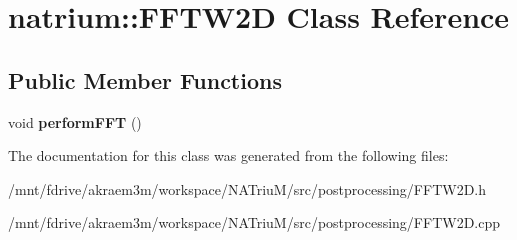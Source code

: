 \hypertarget{classnatrium_1_1FFTW2D}{
\section{natrium::FFTW2D Class Reference}
\label{classnatrium_1_1FFTW2D}
}
\subsection*{Public Member Functions}
\begin{DoxyCompactItemize}
\item 
\hypertarget{classnatrium_1_1FFTW2D_a50f754398d2335061cf8057ccb55d899}{
void {\bfseries performFFT} ()}
\label{classnatrium_1_1FFTW2D_a50f754398d2335061cf8057ccb55d899}

\end{DoxyCompactItemize}


The documentation for this class was generated from the following files:\begin{DoxyCompactItemize}
\item 
/mnt/fdrive/akraem3m/workspace/NATriuM/src/postprocessing/FFTW2D.h\item 
/mnt/fdrive/akraem3m/workspace/NATriuM/src/postprocessing/FFTW2D.cpp\end{DoxyCompactItemize}
